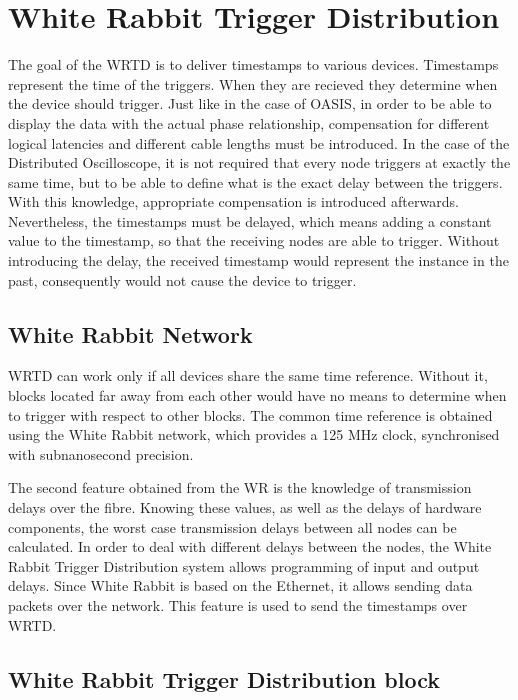 \documentclass[conference]{IEEEtran}
\begin{document}
\section{White Rabbit Trigger Distribution}
The goal of the WRTD is to deliver timestamps to various devices. Timestamps represent the time of the triggers. When they are recieved they determine when the device should trigger. Just like in the case of OASIS, in order to be able to display the data with the actual phase relationship, compensation for different logical latencies and different cable lengths must be introduced. In the case of the Distributed Oscilloscope, it is not required that every node triggers at exactly the same time, but to be able to define what is the exact delay between the triggers. With this knowledge, appropriate compensation is introduced afterwards. Nevertheless, the timestamps must be delayed, which means adding a constant value to the timestamp, so that the receiving nodes are able to trigger. Without introducing the delay, the received timestamp would represent the instance in the past, consequently would not cause the device to trigger.


\subsection{White Rabbit Network}
WRTD can work only if all devices share the same time reference. Without it, blocks located far away from each other would have no means to determine when to trigger with respect to other blocks. The common time reference is obtained using the White Rabbit network, which provides a 125 MHz clock, synchronised with subnanosecond precision\cite{b2}.

The second feature obtained from the WR is the knowledge of transmission delays over the fibre. Knowing these values, as well as the delays of hardware components, the worst case transmission delays between all nodes can be calculated. In order to deal with different delays between the nodes, the White Rabbit Trigger Distribution system allows programming of input and output delays. Since White Rabbit is based on the Ethernet, it allows sending data packets over the network. This feature is used to send the timestamps over WRTD.


\subsection{White Rabbit Trigger Distribution block}
\end{document}
